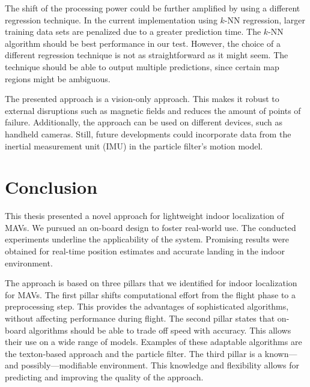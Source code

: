 \documentclass[11pt]{report}
\begin{document}
The shift of the processing power could be further amplified by using
a different regression technique. In the current implementation using
$k$-NN regression, larger training data sets are penalized due to a
greater prediction time. The $k$-NN algorithm should be best
performance in our test. However, the choice of a different regression
technique is not as straightforward as it might seem. The technique
should be able to output multiple predictions, since certain map
regions might be ambiguous.

The presented approach is a vision-only approach. This makes it robust
to external disruptions such as magnetic fields and reduces the amount
of points of failure. Additionally, the approach can be used on
different devices, such as handheld cameras. Still, future
developments could incorporate data from the inertial measurement unit
(IMU) in the particle filter's motion model.



\chapter{Conclusion}
\label{chap:conclusion}

This thesis presented a novel approach for lightweight indoor
localization of MAVs. We pursued an on-board design to foster
real-world use. The conducted experiments underline the applicability
of the system. Promising results were obtained for real-time position
estimates and accurate landing in the indoor environment.

The approach is based on three pillars that we identified for indoor
localization for MAVs. The first pillar shifts computational effort
from the flight phase to a preprocessing step. This provides the
advantages of sophisticated algorithms, without affecting performance
during flight. The second pillar states that on-board algorithms should
be able to trade off speed with accuracy. This allows their use on a
wide range of models. Examples of these adaptable algorithms are the
texton-based approach and the particle filter. The third pillar is a
known---and possibly---modifiable environment. This knowledge and
flexibility allows for predicting and improving the quality of the
approach.
\end{document}
